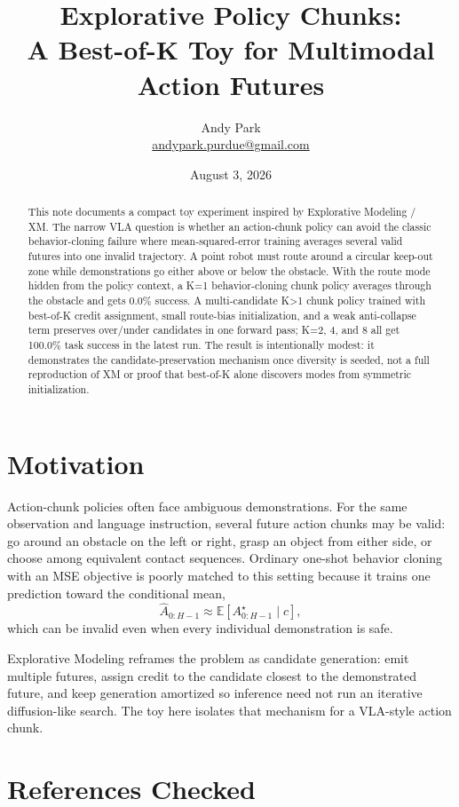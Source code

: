 \documentclass[11pt]{article}
\title{Explorative Policy Chunks:\\A Best-of-K Toy for Multimodal Action Futures}
\author{Andy Park\\\href{mailto:andypark.purdue@gmail.com}{andypark.purdue@gmail.com}}
\date{August 3, 2026}
\begin{document}
\maketitle

\begin{abstract}
This note documents a compact toy experiment inspired by Explorative Modeling / XM. The narrow VLA question is whether an action-chunk policy can avoid the classic behavior-cloning failure where mean-squared-error training averages several valid futures into one invalid trajectory. A point robot must route around a circular keep-out zone while demonstrations go either above or below the obstacle. With the route mode hidden from the policy context, a K=1 behavior-cloning chunk policy averages through the obstacle and gets 0.0\% success. A multi-candidate K>1 chunk policy trained with best-of-K credit assignment, small route-bias initialization, and a weak anti-collapse term preserves over/under candidates in one forward pass; K=2, 4, and 8 all get 100.0\% task success in the latest run. The result is intentionally modest: it demonstrates the candidate-preservation mechanism once diversity is seeded, not a full reproduction of XM or proof that best-of-K alone discovers modes from symmetric initialization.
\end{abstract}

\section{Motivation}

Action-chunk policies often face ambiguous demonstrations. For the same observation and language instruction, several future action chunks may be valid: go around an obstacle on the left or right, grasp an object from either side, or choose among equivalent contact sequences. Ordinary one-shot behavior cloning with an MSE objective is poorly matched to this setting because it trains one prediction toward the conditional mean,
\[
  \hat{A}_{0:H-1} \approx \mathbb{E}\left[A^{\star}_{0:H-1}\mid c\right],
\]
which can be invalid even when every individual demonstration is safe.

Explorative Modeling reframes the problem as candidate generation: emit multiple futures, assign credit to the candidate closest to the demonstrated future, and keep generation amortized so inference need not run an iterative diffusion-like search. The toy here isolates that mechanism for a VLA-style action chunk.

\section{References Checked}
\end{document}
